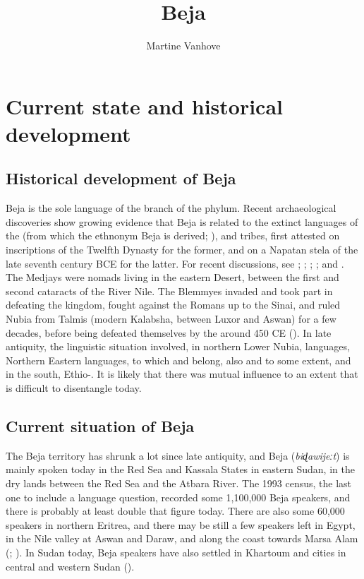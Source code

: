 \documentclass[output=paper]{langsci/langscibook}
\author{Martine Vanhove\affiliation{LLACAN (CNRS, INALCO)}}
\title{Beja}
\begin{document}
\maketitle 
  


 \section{Current state and historical development}


 \subsection{Historical development of Beja}


Beja is the sole language of the   branch of the  phylum. Recent archaeological discoveries show growing evidence that Beja is related to the extinct languages of the  (from which the ethnonym Beja is derived; \citealt[1175]{Rilly2014}), and  tribes, first attested on  inscriptions of the Twelfth Dynasty for the former, and on a Napatan stela of the late seventh century BCE for the latter. For recent discussions, see \citet{Browne2003}; \citet{El-Sayed2011}; \citet{Zibelius-Chen2014}; \citet{Rilly2014}; and \citet{Rilly2018}. The Medjays were nomads living in the eastern  Desert, between the first and second cataracts of the River Nile. The Blemmyes invaded and took part in defeating the  kingdom, fought against the Romans up to the Sinai, and ruled Nubia from Talmis (modern Kalabsha, between Luxor and Aswan) for a few decades, before being defeated themselves by the  around 450 CE (\citealt{Rilly2018}). In late antiquity, the linguistic situation involved, in northern Lower Nubia,  languages, {Northern} {Eastern}  languages, to which  and  belong, also  and  to some extent, and in the south, Ethio-. It is likely that there was mutual influence to an extent that is difficult to disentangle today. 


 
 \subsection{Current situation of Beja}


The Beja territory has shrunk a lot since late antiquity, and Beja (\textit{biɖawijeːt}) is mainly spoken today in the Red Sea and Kassala States in eastern Sudan, in the dry lands between the Red Sea and the Atbara River. The 1993 census, the last one to include a language question, recorded some 1,100,000 Beja speakers, and there is probably at least double that figure today. There are also some 60,000 speakers in northern Eritrea, and there may be still a few speakers left in Egypt, in the Nile valley at Aswan and Daraw, and along the coast towards Marsa Alam (\citealt{Morin1995}; \citealt{Wedekind2012}). In Sudan today, Beja speakers have also settled in Khartoum and cities in central and western Sudan (\citealt[67]{HamidAhmed2005book}).
\end{document}
